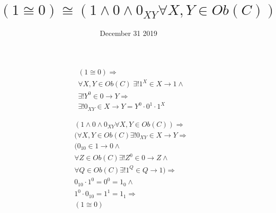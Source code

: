 \documentclass[12pt]{article}
\date{December 31 2019}
\title{$(1 \cong 0) \cong (1 \land 0 \land 0_{XY} \forall X, Y \in Ob(C))$}
\begin{document}
\maketitle

\begin{equation}
\tag{to}
\begin{aligned}
& (1 \cong 0) \Rightarrow \\
& \forall X, Y \in Ob(C)\; \exists! 1^{X} \in X \rightarrow 1 \land \\
& \exists! Y^{0} \in 0 \rightarrow Y \Rightarrow \\
& \exists! 0_{XY} \in X \rightarrow Y = Y^{0} \cdot 0^{1} \cdot 1^{X}
\end{aligned}
\end{equation}

\begin{equation}
\tag{from}
\begin{aligned}
& (1 \land 0 \land 0_{XY} \forall X, Y \in Ob(C)) \Rightarrow \\
& (\forall X, Y \in Ob(C) \exists! 0_{XY} \in X \rightarrow Y \Rightarrow \\
& (0_{10} \in 1 \rightarrow 0 \land \\
& \forall Z \in Ob(C) \exists! Z^{0} \in 0 \rightarrow Z \land \\
& \forall Q \in Ob(C) \exists! 1^{Q} \in Q \rightarrow 1) \Rightarrow \\
& 0_{10} \cdot 1^{0} = 0^{0} = 1_{0} \land \\
& 1^{0} \cdot 0_{10} = 1^{1} = 1_{1} \Rightarrow \\
& (1 \cong 0)
\end{aligned}
\end{equation}
\end{document}
